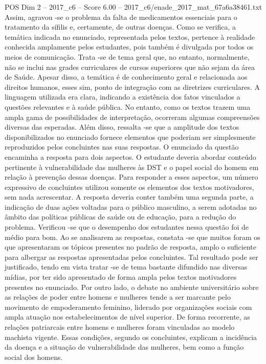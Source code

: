 \begin{textsample}{POS Dim 2 – 2017\_c6 – Score 6.00 – 2017\_c6/enade\_2017\_mat\_67a6a38461.txt}
Assim, agravou -se o problema da falta de medicamentos essenciais para o tratamento da sífilis e, certamente, de outras doenças.
Como se verifica, a temática indicada no enunciado, representada pelos textos, pertence à realidade conhecida amplamente pelos estudantes, pois também é divulgada por todos os meios de comunicação.
Trata -se de tema geral que, no entanto, normalmente, não se inclui nas grades curriculares de cursos superiores que não sejam da área de Saúde.
Apesar disso, a temática é de conhecimento geral e relacionada aos direitos humanos, esses sim, ponto de integração com as diretrizes curriculares.
A linguagem utilizada era clara, indicando a existência dos fatos vinculados a questões relevantes e à saúde pública.
No entanto, como os textos trazem uma ampla gama de possibilidades de interpretação, ocorreram algumas compreensões diversas das esperadas.
Além disso, ressalta -se que a amplitude dos textos disponibilizados no enunciado fornece elementos que poderiam ser simplesmente reproduzidos pelos concluintes nas suas respostas.
O enunciado da questão encaminha a resposta para dois aspectos.
O estudante deveria abordar conteúdo pertinente à vulnerabilidade das mulheres às DST e o papel social do homem em relação à prevenção dessas doenças.
Para responder a esses aspectos, um número expressivo de concluintes utilizou somente os elementos dos textos motivadores, sem nada acrescentar.
A resposta deveria conter também uma segunda parte, a indicação de duas ações voltadas para o público masculino, a serem adotadas no âmbito das políticas públicas de saúde ou de educação, para a redução do problema.
Verificou -se que o desempenho dos estudantes nessa questão foi de médio para bom.
Ao se analisarem as respostas, constata -se que muitos foram os que apresentaram os tópicos presentes no padrão de resposta, amplo o suficiente para albergar as respostas apresentadas pelos concluintes.
Tal resultado pode ser justificado, tendo em vista tratar -se de tema bastante difundido nas diversas mídias, por ter sido apresentado de forma ampla pelos textos motivadores presentes no enunciado.
Por outro lado, o debate no ambiente universitário sobre as relações de poder entre homens e mulheres tende a ser marcante pelo movimento de empoderamento feminino, liderado por organizações sociais com ampla atuação nos estabelecimentos de nível superior.
De forma recorrente, as relações patriarcais entre homens e mulheres foram vinculadas ao modelo machista vigente.
Essas condições, segundo os concluintes, explicam a incidência da doença e a situação de vulnerabilidade das mulheres, bem como a função social dos homens.

\end{textsample}
